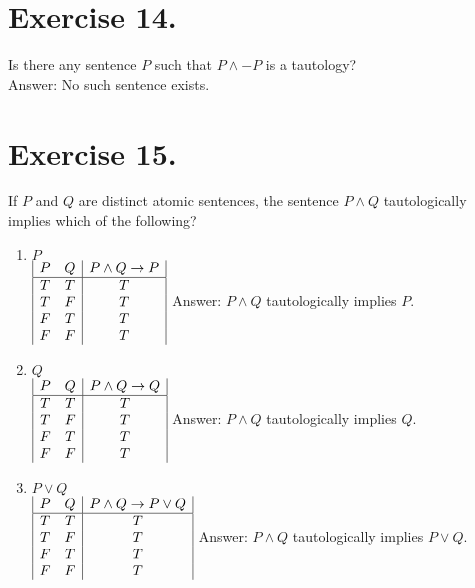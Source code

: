 \documentclass{article}
\begin{document}
\section*{Exercise 14.}
Is there any sentence \(P\) such that \(P \land -P\) is a tautology?\\
Answer: No such sentence exists.

\section*{Exercise 15.}
If \(P\) and \(Q\) are distinct atomic sentences, the sentence \(P \land Q\) tautologically implies which of the following?
\singlespace

\begin{enumerate}[label=(\alph*)]
\item \(P\)\\
\(
\begin{array}{|c c|c|}
P & Q & P \land Q \rightarrow P\\ 
\hline
T & T & T\\
T & F & T\\
F & T & T\\
F & F & T\\
\end{array}
\)
\singlespace
Answer: \(P \land Q \) tautologically implies \(P\).\\
\medskip

\item \(Q\)\\
\(
\begin{array}{|c c|c|}
P & Q & P \land Q \rightarrow Q\\ 
\hline
T & T & T\\
T & F & T\\
F & T & T\\
F & F & T\\
\end{array}
\)
\singlespace
Answer: \(P \land Q \) tautologically implies \(Q\).\\
\medskip

\item \(P \lor Q\)\\
\(
\begin{array}{|c c|c|}
P & Q & P \land Q \rightarrow P \lor Q\\ 
\hline
T & T & T\\
T & F & T\\
F & T & T\\
F & F & T\\
\end{array}
\)
\singlespace
Answer: \(P \land Q \) tautologically implies \(P \lor Q\).\\
\medskip


\end{enumerate}
\end{document}
